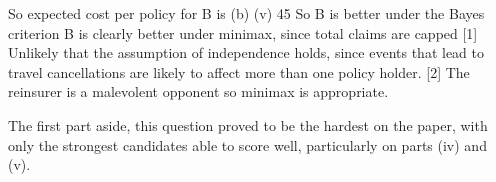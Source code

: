 \documentclass[a4paper,12pt]{article}
\begin{document}
So expected cost per policy for B is
(b)
(v)
45%
So B is better under the Bayes criterion 
B is clearly better under minimax, since total claims are capped [1]
Unlikely that the assumption of independence holds, since events that lead to
travel cancellations are likely to affect more than one policy holder.
[2]
The reinsurer is a malevolent opponent so minimax is appropriate.


The first part aside, this question proved to be the hardest on the paper,
with only the strongest candidates able to score well, particularly on
parts (iv) and (v).
\end{document}
